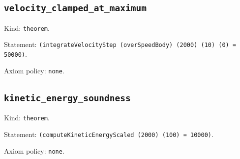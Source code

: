 \documentclass[11pt]{article}
\begin{document}
\subsection*{\texttt{velocity\_clamped\_at\_maximum}}
\noindent Kind: \texttt{theorem}.\par
\noindent Statement: \texttt{(integrateVelocityStep (overSpeedBody) (2000) (10) (0) = 50000)}.\par
\noindent Axiom policy: \texttt{none}.\par
\subsection*{\texttt{kinetic\_energy\_soundness}}
\noindent Kind: \texttt{theorem}.\par
\noindent Statement: \texttt{(computeKineticEnergyScaled (2000) (100) = 10000)}.\par
\noindent Axiom policy: \texttt{none}.\par
\end{document}

